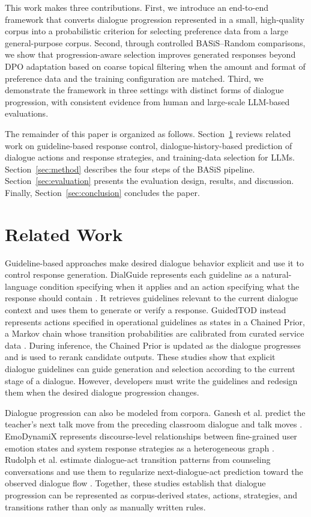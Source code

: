 \documentclass[manuscript,review,anonymous]{acmart}
\begin{document}
This work makes three contributions. First, we introduce an end-to-end framework that converts dialogue progression represented in a small, high-quality corpus into a probabilistic criterion for selecting preference data from a large general-purpose corpus. Second, through controlled BASiS--Random comparisons, we show that progression-aware selection improves generated responses beyond DPO adaptation based on coarse topical filtering when the amount and format of preference data and the training configuration are matched. Third, we demonstrate the framework in three settings with distinct forms of dialogue progression, with consistent evidence from human and large-scale LLM-based evaluations.

The remainder of this paper is organized as follows. Section~\ref{sec:relwork} reviews related work on guideline-based response control, dialogue-history-based prediction of dialogue actions and response strategies, and training-data selection for LLMs. Section~\ref{sec:method} describes the four steps of the BASiS pipeline. Section~\ref{sec:evaluation} presents the evaluation design, results, and discussion. Finally, Section~\ref{sec:conclusion} concludes the paper.

\section{Related Work}
\label{sec:relwork}

Guideline-based approaches make desired dialogue behavior explicit and use it to control response generation. DialGuide represents each guideline as a natural-language condition specifying when it applies and an action specifying what the response should contain \cite{gupta2023dialguide}. It retrieves guidelines relevant to the current dialogue context and uses them to generate or verify a response. GuidedTOD instead represents actions specified in operational guidelines as states in a Chained Prior, a Markov chain whose transition probabilities are calibrated from curated service data \cite{wen2025guidedtod}. During inference, the Chained Prior is updated as the dialogue progresses and is used to rerank candidate outputs. These studies show that explicit dialogue guidelines can guide generation and selection according to the current stage of a dialogue. However, developers must write the guidelines and redesign them when the desired dialogue progression changes.

Dialogue progression can also be modeled from corpora. Ganesh et al. predict the teacher's next talk move from the preceding classroom dialogue and talk moves \cite{ganesh2021teacher}. EmoDynamiX represents discourse-level relationships between fine-grained user emotion states and system response strategies as a heterogeneous graph \cite{wan2025emodynamix}. Rudolph et al. estimate dialogue-act transition patterns from counseling conversations and use them to regularize next-dialogue-act prediction toward the observed dialogue flow \cite{rudolph2026transition}. Together, these studies establish that dialogue progression can be represented as corpus-derived states, actions, strategies, and transitions rather than only as manually written rules.
\end{document}
